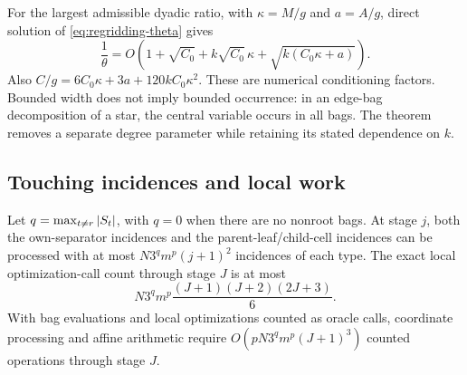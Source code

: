 For the largest admissible dyadic ratio, with
$\kappa=M/g$ and $a=A/g$, direct solution of
\eqref{eq:regridding-theta} gives
\begin{equation}\label{eq:regridding-conditioning}
 \frac1\theta=O\left(1+\sqrt{C_0}
       +k\sqrt{C_0}\,\kappa
       +\sqrt{k(C_0\kappa+a)}\right).
\end{equation}
Also $C/g=6C_0\kappa+3a+120kC_0\kappa^2$.
These are numerical conditioning factors. Bounded width does not
imply bounded occurrence: in an edge-bag decomposition of a star, the
central variable occurs in all bags. The theorem removes a separate
degree parameter while retaining its stated dependence on $k$.

\subsection{Touching incidences and local work}

\begin{proposition}\label{prop:regridding-incidence}
Let $q=\max_{t\ne r}\left\lvert S_t\right\rvert$, with $q=0$ when there are no
nonroot bags. At stage $j$, both the own-separator incidences and
the parent-leaf/child-cell incidences can be processed with at most
$N3^qm^p(j+1)^2$ incidences of each type. The exact local
optimization-call count through stage $J$ is at most
\begin{equation}\label{eq:regridding-calls}
 N3^qm^p\frac{(J+1)(J+2)(2J+3)}6.
\end{equation}
With bag evaluations and local optimizations counted as oracle
calls, coordinate processing and affine arithmetic require
$O(pN3^qm^p(J+1)^3)$ counted operations through stage $J$.
\end{proposition}

